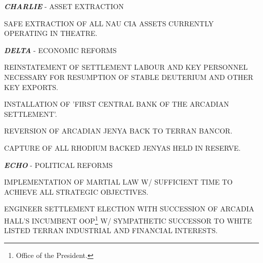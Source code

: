 \item {\bf\em CHARLIE} - ASSET EXTRACTION
    \startitemize[n]
    \item SAFE EXTRACTION OF ALL NAU CIA ASSETS CURRENTLY OPERATING IN THEATRE.
    \stopitemize

\item {\bf\em DELTA} - ECONOMIC REFORMS
    \startitemize[n]
    \item REINSTATEMENT OF SETTLEMENT LABOUR AND KEY PERSONNEL NECESSARY FOR RESUMPTION OF STABLE DEUTERIUM AND OTHER KEY EXPORTS.
    \item INSTALLATION OF 'FIRST CENTRAL BANK OF THE ARCADIAN SETTLEMENT'.
    \item REVERSION OF ARCADIAN JENYA BACK TO TERRAN BANCOR.
    \item CAPTURE OF ALL RHODIUM BACKED JENYAS HELD IN RESERVE.
    \stopitemize

\item {\bf\em ECHO} - POLITICAL REFORMS
    \startitemize[n]
    \item IMPLEMENTATION OF MARTIAL LAW W/ SUFFICIENT TIME TO ACHIEVE ALL STRATEGIC OBJECTIVES.
    \item ENGINEER SETTLEMENT ELECTION WITH SUCCESSION OF ARCADIA HALL'S INCUMBENT OOP\footnote{Office of the President.} W/ SYMPATHETIC SUCCESSOR TO WHITE LISTED TERRAN INDUSTRIAL AND FINANCIAL INTERESTS.
    \stopitemize





